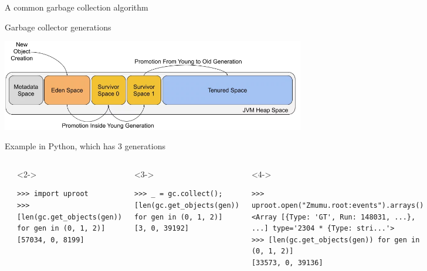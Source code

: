\documentclass[aspectratio=169]{beamer}
\begin{document}
\begin{frame}{A common garbage collection algorithm}
\vspace{0.5 cm}
\end{frame}

\begin{frame}{Garbage collector generations}
\begin{center}
\includegraphics[width=\linewidth]{java-collection-6.png}
\end{center}
\end{frame}

\begin{frame}[fragile]{Example in Python, which has 3 generations}
\small
\begin{columns}
\begin{verbatim}
>>> import gc
>>> _ = gc.collect(); gc.disable()
>>> [len(gc.get_objects(gen)) for gen in (0, 1, 2)]
[8, 0, 8220]
\end{verbatim}

\begin{uncoverenv}<2->
\begin{verbatim}
>>> import uproot
>>> [len(gc.get_objects(gen)) for gen in (0, 1, 2)]
[57034, 0, 8199]
\end{verbatim}
\end{uncoverenv}

\begin{uncoverenv}<3->
\begin{verbatim}
>>> _ = gc.collect(); [len(gc.get_objects(gen)) for gen in (0, 1, 2)]
[3, 0, 39192]
\end{verbatim}
\end{uncoverenv}

\begin{uncoverenv}<4->
\begin{verbatim}
>>> uproot.open("Zmumu.root:events").arrays()
<Array [{Type: 'GT', Run: 148031, ...}, ...] type='2304 * {Type: stri...'>
>>> [len(gc.get_objects(gen)) for gen in (0, 1, 2)]
[33573, 0, 39136]
\end{verbatim}
\end{uncoverenv}

\begin{uncoverenv}<5->
\begin{verbatim}
>>> _ = gc.collect(); [len(gc.get_objects(gen)) for gen in (0, 1, 2)]
[3, 0, 56692]
\end{verbatim}
\end{uncov
\end{uncoverenv}
\end{columns}
\end{frame}
\end{document}
